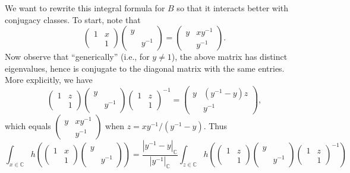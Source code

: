 \documentclass[reqno]{amsart} 
\begin{document}
We want to rewrite this integral formula for $B$ so that it interacts better with conjugacy classes.  To start, note that
\begin{equation*}
  \begin{pmatrix}
    1 & x \\
      & 1
  \end{pmatrix}
  \begin{pmatrix}
    y &  \\
      & y^{-1}
  \end{pmatrix}
  = 
  \begin{pmatrix}
    y & x y^{-1} \\
      & y^{-1}
  \end{pmatrix}
  .
\end{equation*}
Now observe that ``generically'' (i.e., for $y \neq 1$), the above matrix has distinct eigenvalues, hence is conjugate to the diagonal matrix with the same entries.  More explicitly, we have
\begin{equation*}
  \begin{pmatrix}
    1 & z \\
      & 1
  \end{pmatrix}
  \begin{pmatrix}
    y &  \\
      & y^{-1}
  \end{pmatrix}
  \begin{pmatrix}
    1 & z \\
      & 1
  \end{pmatrix}
  ^{-1} =
  \begin{pmatrix}
    y & (y^{-1} - y ) z \\
      & y^{-1}
  \end{pmatrix}
  ,
\end{equation*}
which equals $
\begin{pmatrix}
  y & x y^{-1} \\
  & y^{-1}
\end{pmatrix}
$ when $z = x y^{-1} / (y^{-1} - y)$.  Thus
\begin{equation}\label{eqn:sl2-change-of-var}
  \int_{x \in \mathbb{C}}
  h (
\begin{pmatrix}
    1 & x \\
    & 1
  \end{pmatrix} 
\begin{pmatrix}
    y &  \\
    & y ^{-1}
  \end{pmatrix}
  ) = \frac {|y^{-1} - y|_{\mathbb{C}}}{|y^{-1}|_{\mathbb{C}}} \int_{z \in \mathbb{C}} h (
\begin{pmatrix}
    1 & z \\
    & 1
  \end{pmatrix} 
\begin{pmatrix}
    y &  \\
    & y^{-1}
  \end{pmatrix}
  \begin{pmatrix}
    1 & z \\
    & 1
  \end{pmatrix}
  ^{-1} )
\end{equation}
\end{document}
